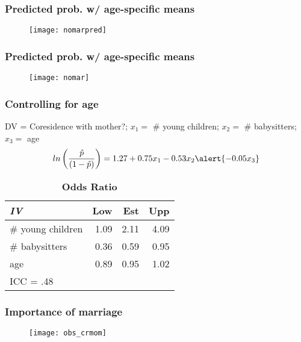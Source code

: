 \documentclass{beamer}
\begin{document}
\begin{frame}
\frametitle{Predicted prob. w/ age-specific means}
\begin{figure}
\texttt{[image: nomarpred]}
\end{figure}
\end{frame}


\begin{frame}
\frametitle{Predicted prob. w/ age-specific means}
\begin{figure}
\texttt{[image: nomar]}
\end{figure}
\end{frame}



\begin{frame}
\frametitle{Controlling for age}

DV = Coresidence with mother?;
$x_1 =$ \# young children; $x_2 =$ \# babysitters; \alert{$x_3 =$ age}
\begin{equation*}
ln\left(\frac{\hat{p}}{(1 - \hat{p})}\right) = 1.27 + 0.75x_{1} - 0.53x_{2} \alert{- 0.05x_{3}}
\end{equation*}

\begin{table}[h]
\caption {\textbf{Odds Ratio}}
  \centering
  \begin{tabular}{| l | r r r|} 
  	\hline
	\emph{IV} & Low & Est & Upp \\ \hline
	\# young children & 1.09 & 2.11 & 4.09\\
	\# babysitters & 0.36 & 0.59 & 0.95\\
	age & \alert{0.89} & \alert{0.95} & \alert{1.02}\\	 \hline
	\multicolumn{4}{l}{ICC = .48}\\
  \end{tabular}
\end{table}
\end{frame}


\begin{frame}
\frametitle{Importance of marriage}
\begin{figure}
\texttt{[image: obs\_crmom]}
\end{figure}
\end{frame}

\end{document}
